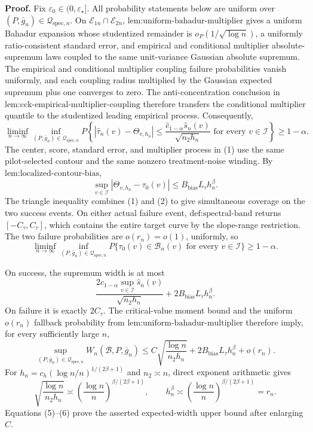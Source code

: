 \textbf{Proof.}
Fix \(\varepsilon_0\in(0,\varepsilon_\star]\).  All probability statements below are uniform over \((P,\bar g_n)\in\mathcal Q_{\mathrm{spec},n}\).  On \(\mathcal E_{1n}\cap\mathcal E_{2n}\), \(\text{lem:uniform-bahadur-multiplier}\) gives a uniform Bahadur expansion whose studentized remainder is \(o_P(1/\sqrt{\log n})\), a uniformly ratio-consistent standard error, and empirical and conditional multiplier absolute-supremum laws coupled to the same unit-variance Gaussian absolute supremum.  The empirical and conditional multiplier coupling failure probabilities vanish uniformly, and each coupling radius multiplied by the Gaussian expected supremum plus one converges to zero.  The anti-concentration conclusion in \(\text{lem:cck-empirical-multiplier-coupling}\) therefore transfers the conditional multiplier quantile to the studentized leading empirical process.  Consequently,
\[
 \liminf_{n\to\infty}\inf_{(P,\bar g_n)\in\mathcal Q_{\mathrm{spec},n}}
 P\left\{
 |\widehat\tau_n(v)-\Theta_{v,h_n}|
 \le\frac{\widehat c_{1-\alpha}\widehat s_n(v)}{\sqrt{n_2h_n}}
 \text{ for every }v\in\mathcal I
 \right\}\ge1-\alpha. \tag{1}
\]
The center, score, standard error, and multiplier process in (1) use the same pilot-selected contour and the same nonzero treatment-noise winding.  By \(\text{lem:localized-contour-bias}\),
\[
 \sup_{v\in\mathcal I}|\Theta_{v,h_n}-\tau_0(v)|
 \le B_{\mathrm{bias}}L_\tau h_n^\beta. \tag{2}
\]
The triangle inequality combines (1) and (2) to give simultaneous coverage on the two success events.  On either actual failure event, \(\text{def:spectral-band}\) returns \([-C_\tau,C_\tau]\), which contains the entire target curve by the slope-range restriction.  The two failure probabilities are \(o(r_n)=o(1)\), uniformly, so
\[
 \liminf_{n\to\infty}\inf_{(P,\bar g_n)\in\mathcal Q_{\mathrm{spec},n}}
 P\{\tau_0(v)\in\mathcal B_n(v)\text{ for every }v\in\mathcal I\}
 \ge1-\alpha. \tag{3}
\]

On success, the supremum width is at most
\[
 \frac{2\widehat c_{1-\alpha}\sup_{v\in\mathcal I}\widehat s_n(v)}
 {\sqrt{n_2h_n}}
 +2B_{\mathrm{bias}}L_\tau h_n^\beta. \tag{4}
\]
On failure it is exactly \(2C_\tau\).  The critical-value moment bound and the uniform \(o(r_n)\) fallback probability from \(\text{lem:uniform-bahadur-multiplier}\) therefore imply, for every sufficiently large \(n\),
\[
 \sup_{(P,\bar g_n)\in\mathcal Q_{\mathrm{spec},n}}
 W_n(\mathcal B,P,\bar g_n)
 \le C\sqrt{\frac{\log n}{n_2h_n}}
 +2B_{\mathrm{bias}}L_\tau h_n^\beta+o(r_n). \tag{5}
\]
For \(h_n=c_h(\log n/n)^{1/(2\beta+1)}\) and \(n_2\asymp n\), direct exponent arithmetic gives
\[
 \sqrt{\frac{\log n}{n_2h_n}}
 \asymp
 \left(\frac{\log n}{n}\right)^{\beta/(2\beta+1)},
 \qquad
 h_n^\beta
 \asymp
 \left(\frac{\log n}{n}\right)^{\beta/(2\beta+1)}
 =r_n. \tag{6}
\]
Equations (5)--(6) prove the asserted expected-width upper bound after enlarging \(C\).

